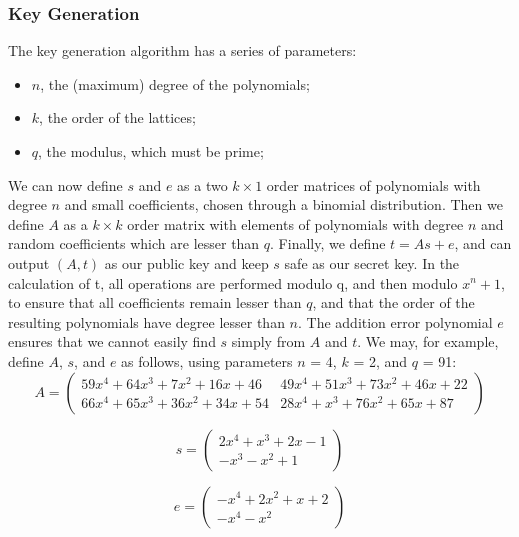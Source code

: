 \documentclass{article}
\begin{document}
\subsubsection{Key Generation}
The key generation algorithm has a series of parameters:
\begin{itemize}
   \item $n$, the (maximum) degree of the polynomials;
   \item $k$, the order of the lattices;
   \item $q$, the modulus, which must be prime;
\end{itemize}
We can now define $s$ and $e$ as a two $k \times 1$ order matrices of polynomials with degree $n$ and small coefficients,
chosen through a binomial distribution.
Then we define $A$ as a $k \times k$ order matrix with elements of polynomials with degree $n$ and random coefficients which are lesser than $q$.
Finally, we define $t = As + e$, and can output $(A, t)$ as our public key and keep $s$ safe as our secret key.
In the calculation of t, all operations are performed modulo q, and then modulo $x^{n} + 1$, to ensure that all coefficients remain lesser than $q$,
and that the order of the resulting polynomials have degree lesser than $n$.
The addition error polynomial $e$ ensures that we cannot easily find $s$ simply from $A$ and $t$.
\medskip
We may, for example, define $A$, $s$, and $e$ as follows, using parameters $n$ = 4, $k$ = 2, and $q$ = 91:
\[ A = \begin{pmatrix}
         59x^4 + 64x^3 + 7x^2 + 16x + 46 & 49x^4 + 51x^3 + 73x^2 + 46x + 22 \\
         66x^4 + 65x^3 + 36x^2 + 34x + 54 & 28x^4 + x^3 + 76x^2 + 65x + 87
       \end{pmatrix}
\]

\[ s = \begin{pmatrix}
   2x^4 + x^3 + 2x - 1 \\
   -x^3 - x^2 + 1
       \end{pmatrix}
\]

\[
   e = \begin{pmatrix}
      -x^4 + 2x^2 + x + 2 \\
      -x^4 -x^2
       \end{pmatrix}
\]
\end{document}

